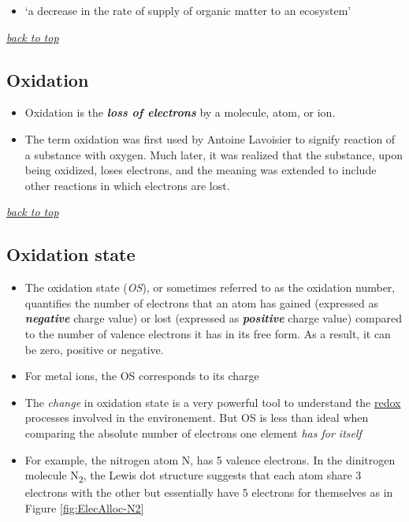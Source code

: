 \documentclass[]{book}
\providecommand{\tightlist}{%
  \setlength{\itemsep}{0pt}\setlength{\parskip}{0pt}}
\theoremstyle{definition}
\theoremstyle{definition}
\theoremstyle{definition}
\theoremstyle{remark}
\begin{document}
\begin{itemize}
\tightlist
\item
  `a decrease in the rate of supply of organic matter to an ecosystem'
  \citep{Nixon2009-ft}
\end{itemize}

\emph{\protect\hyperlink{top}{back to top}}

\hypertarget{oxidation}{\subsection{Oxidation}\label{oxidation}}

\begin{itemize}
\tightlist
\item
  Oxidation is the \emph{\textbf{loss of electrons}} by a molecule,
  atom, or ion.
\item
  The term oxidation was first used by Antoine Lavoisier to signify
  reaction of a substance with oxygen. Much later, it was realized that
  the substance, upon being oxidized, loses electrons, and the meaning
  was extended to include other reactions in which electrons are lost.
\end{itemize}

\emph{\protect\hyperlink{top}{back to top}}

\hypertarget{oxidation-state}{\subsection{Oxidation
state}\label{oxidation-state}}

\begin{itemize}
\tightlist
\item
  The oxidation state (\emph{OS}), or sometimes referred to as the
  oxidation number, quantifies the number of electrons that an atom has
  gained (expressed as \emph{\textbf{negative}} charge value) or lost
  (expressed as \emph{\textbf{positive}} charge value) compared to the
  number of valence electrons it has in its free form. As a result, it
  can be zero, positive or negative.
\item
  For metal ions, the OS corresponds to its charge
\item
  The \emph{change} in oxidation state is a very powerful tool to
  understand the \protect\hyperlink{redox}{redox} processes involved in
  the environement. But OS is less than ideal when comparing the
  absolute number of electrons one element \emph{has for itself}
\item
  For example, the nitrogen atom N, has 5 valence electrons. In the
  dinitrogen molecule N\textsubscript{2}, the Lewis dot structure
  suggests that each atom share 3 electrons with the other but
  essentially have 5 electrons for themselves as in Figure
  \ref{fig:ElecAlloc-N2}
\end{itemize}
\end{document}
